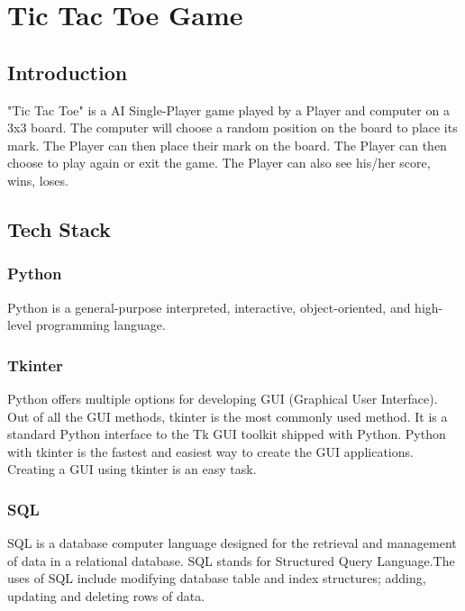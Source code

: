 \chapter{Tic Tac Toe Game}
\section{Introduction}
"Tic Tac Toe" is a AI Single-Player game played by a Player and computer on a 3x3 board.
The computer will choose a random position on the board to place its mark.
The Player can then place their mark on the board.
The Player can then choose to play again or exit the game.
The Player can also see his/her score, wins, loses.
\section{Tech Stack}
\label{Tech_Stack}
\subsection{Python}
Python is a general-purpose interpreted, interactive, object-oriented, and high-level programming language. 
\subsection{Tkinter}
Python offers multiple options for developing GUI (Graphical User Interface). Out of all the GUI methods, tkinter is the most commonly used method. It is a standard Python interface to the Tk GUI toolkit shipped with Python. Python with tkinter is the fastest and easiest way to create the GUI applications. Creating a GUI using tkinter is an easy task.
\subsection{SQL}
SQL is a database computer language designed for the retrieval and management of data in a relational database. SQL stands for Structured Query Language.The uses of SQL include modifying database table and index structures; adding, updating and deleting rows of data.